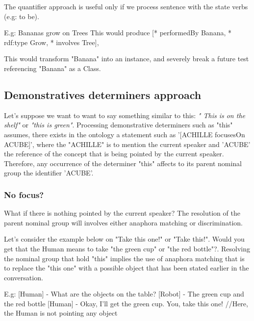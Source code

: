 \documentclass[twoside,a4paper,10pt]{report}
\begin{document}
The quantifier approach is useful only if we process sentence with the state verbs (e.g: to be).


\small
\begin{verbatimtab}
  
  E.g: Bananas grow on Trees
  This would produce 
  [* performedBy Banana, 
   * rdf:type Grow,
   * involves Tree], 
  
  This would transform "Banana" into an instance, and severely break a future test referencing
"Banana" as a Class.
  
\end{verbatimtab}
\normalsize

\subsection{Demonstratives determiners approach}
\label{b4ad6f4ec31665f1d879aeafb5ba415e}%
Let's suppose we want to want to say something similar to this: \textsl{" This is on the shelf"} or \textsl{"this is green"}.
Processing demonstrative determiners such as "this" assumes, there exists in the ontology a statement such as '[ACHILLE focusesOn A{\textunderscore}CUBE]’, where the "ACHILLE"
is to mention the current speaker and 'A{\textunderscore}CUBE' the reference of the concept that is being pointed by the current speaker.
Therefore, any occurrence of the determiner "this" affects to its parent nominal group the identifier 'A{\textunderscore}CUBE'.


\subsubsection{No focus?}
What if there is nothing pointed by the current speaker? The resolution of the parent nominal group will involves either anaphora matching or discrimination.

Let's consider the example below on "Take this one!" or "Take this!".
Would you get that the Human means to take "the green cup" or "the red bottle"?. 
Resolving the nominal group that hold "this" implies the use of anaphora matching that is to replace the "this one" with a possible object that has been stated earlier in the conversation.



\small
\begin{verbatimtab}
  E.g: 
  [Human] - What are the objects on the table?
  [Robot] - The green cup and the red bottle
  [Human] - Okay, I'll get the green cup. You, take this one! //Here, the Human is not pointing any
object
\end{verbatimtab}
\normalsize
\end{document}

